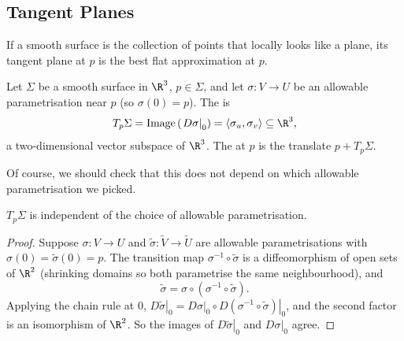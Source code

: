 \subsection{Tangent Planes}

If a smooth surface is the collection of points that locally looks like a plane, its tangent plane at $p$ is the best flat approximation at $p$.

\begin{definition}
    Let $\Sigma$ be a smooth surface in $\R^3$, $p \in \Sigma$, and let $\sigma: V \rightarrow U$ be an allowable parametrisation near $p$ (so $\sigma(0) = p$). The  is
    $$
    T_p \Sigma = \operatorname{Image}\left(\left.D\sigma\right|_0\right) = \langle \sigma_u, \sigma_v \rangle \subseteq \R^3,
    $$
    a two-dimensional vector subspace of $\R^3$. The  at $p$ is the translate $p + T_p \Sigma$.
    \begin{center}
    \end{center}
\end{definition}

Of course, we should check that this does not depend on which allowable parametrisation we picked.

\begin{lemma}
    $T_p \Sigma$ is independent of the choice of allowable parametrisation.
\end{lemma}
\begin{proof}
    Suppose $\sigma: V \rightarrow U$ and $\tilde{\sigma}: \tilde{V} \rightarrow \tilde{U}$ are allowable parametrisations with $\sigma(0) = \tilde{\sigma}(0) = p$. The transition map $\sigma^{-1} \circ \tilde{\sigma}$ is a diffeomorphism of open sets of $\R^2$ (shrinking domains so both parametrise the same neighbourhood), and
    $$
    \tilde{\sigma} = \sigma \circ (\sigma^{-1} \circ \tilde{\sigma}).
    $$
    Applying the chain rule at $0$, $\left.D\tilde{\sigma}\right|_0 = \left.D\sigma\right|_0 \circ \left.D(\sigma^{-1} \circ \tilde{\sigma})\right|_0$, and the second factor is an isomorphism of $\R^2$. So the images of $\left.D\tilde{\sigma}\right|_0$ and $\left.D\sigma\right|_0$ agree.
\end{proof}

